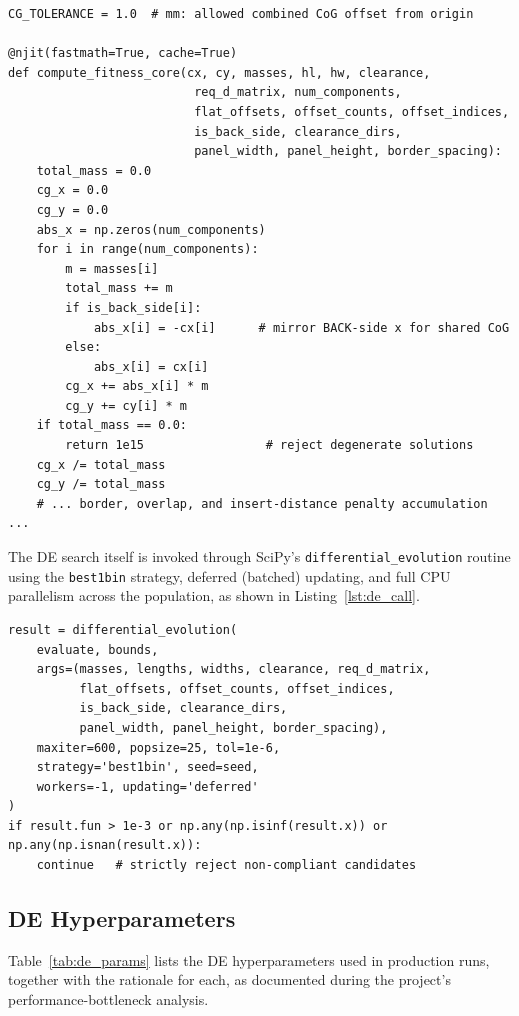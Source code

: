 \documentclass[11pt,a4paper,oneside]{report}
\begin{document}
\begin{lstlisting}[caption={Numba-accelerated fitness core (excerpt from \texttt{DE/de.py})}, label={lst:numba_core}]
CG_TOLERANCE = 1.0  # mm: allowed combined CoG offset from origin

@njit(fastmath=True, cache=True)
def compute_fitness_core(cx, cy, masses, hl, hw, clearance,
                          req_d_matrix, num_components,
                          flat_offsets, offset_counts, offset_indices,
                          is_back_side, clearance_dirs,
                          panel_width, panel_height, border_spacing):
    total_mass = 0.0
    cg_x = 0.0
    cg_y = 0.0
    abs_x = np.zeros(num_components)
    for i in range(num_components):
        m = masses[i]
        total_mass += m
        if is_back_side[i]:
            abs_x[i] = -cx[i]      # mirror BACK-side x for shared CoG
        else:
            abs_x[i] = cx[i]
        cg_x += abs_x[i] * m
        cg_y += cy[i] * m
    if total_mass == 0.0:
        return 1e15                 # reject degenerate solutions
    cg_x /= total_mass
    cg_y /= total_mass
    # ... border, overlap, and insert-distance penalty accumulation ...
\end{lstlisting}

The DE search itself is invoked through SciPy's \texttt{differential\_evolution} routine using the \texttt{best1bin} strategy, deferred (batched) updating, and full CPU parallelism across the population, as shown in Listing~\ref{lst:de_call}.

\begin{lstlisting}[caption={DE solver invocation (excerpt from \texttt{DE/de.py})}, label={lst:de_call}]
result = differential_evolution(
    evaluate, bounds,
    args=(masses, lengths, widths, clearance, req_d_matrix,
          flat_offsets, offset_counts, offset_indices,
          is_back_side, clearance_dirs,
          panel_width, panel_height, border_spacing),
    maxiter=600, popsize=25, tol=1e-6,
    strategy='best1bin', seed=seed,
    workers=-1, updating='deferred'
)
if result.fun > 1e-3 or np.any(np.isinf(result.x)) or np.any(np.isnan(result.x)):
    continue   # strictly reject non-compliant candidates
\end{lstlisting}

\subsection{DE Hyperparameters}
Table~\ref{tab:de_params} lists the DE hyperparameters used in production runs, together with the rationale for each, as documented during the project's performance-bottleneck analysis.
\end{document}

